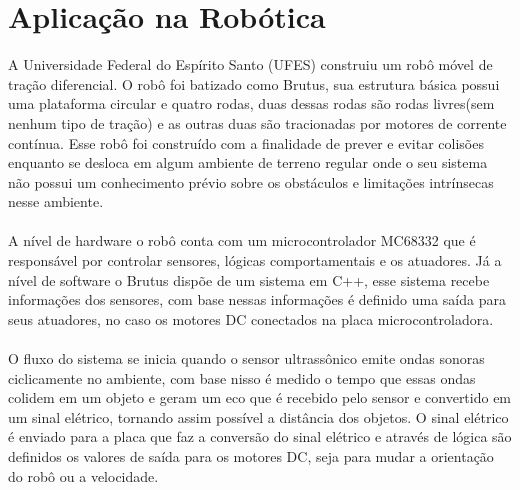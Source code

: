 \chapter{Aplicação na Robótica}
\label{chap:mat}

A Universidade Federal do Espírito Santo (UFES)  construiu um robô móvel de tração diferencial. O robô foi batizado como Brutus, sua estrutura básica possui  uma plataforma circular e quatro rodas, duas dessas rodas são rodas livres(sem nenhum tipo de tração) e as outras duas são  tracionadas por motores  de corrente contínua.  Esse robô foi construído com a finalidade de prever e evitar colisões enquanto se desloca em algum ambiente de terreno regular onde o seu sistema não possui um conhecimento prévio sobre os obstáculos e limitações intrínsecas nesse ambiente.\\
\\
A nível de hardware o robô conta com um microcontrolador MC68332 que é responsável por controlar sensores, lógicas comportamentais e os atuadores. Já a nível de software o Brutus dispõe de um sistema em C++, esse sistema recebe informações dos sensores, com base nessas informações é definido uma saída para seus atuadores, no caso os motores DC conectados na placa microcontroladora.\\
\\
O fluxo do sistema se inicia quando o sensor ultrassônico emite ondas sonoras ciclicamente no ambiente, com base nisso é medido o tempo que essas ondas colidem em um objeto e geram um eco que é recebido pelo sensor e convertido em um sinal elétrico, tornando assim possível a distância dos objetos.  O sinal elétrico é enviado para a placa que faz a conversão do sinal elétrico e através de lógica são definidos os valores de saída para os motores DC, seja para mudar a orientação do robô ou a velocidade.\\


